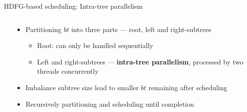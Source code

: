 \documentclass{beamer}
\begin{document}
\begin{CJK}{UTF8}{bkai}
            \begin{frame}{HDFG-based scheduling: Intra-tree parallelism}
                \begin{columns}
                    \begin{column}{0.35\textwidth}
                    \end{column}
                    \begin{column}{0.65\textwidth}
                        \begin{itemize}
                            \item <2->{Partitioning $bt$ into three parts --- root, left and right-subtrees
                                \begin{itemize}
                                    \item Root: can only be handled sequentially
                                    \item Left and right-subtrees --- \textbf{intra-tree parallelism}, processed by two threads concurrently
                                \end{itemize}
                            }
                        \item <3->{Imbalance subtree size lead to smaller $bt$ remaining after scheduling}
                        \item <4->{Recursively partitioning and scheduling until completion}
                        \end{itemize} 
                        \vspace{1em} 
                        \vspace{1em} 
                        \centering
                    \end{column}
                \end{columns}
            \end{frame}


\end{CJK}
\end{document}
